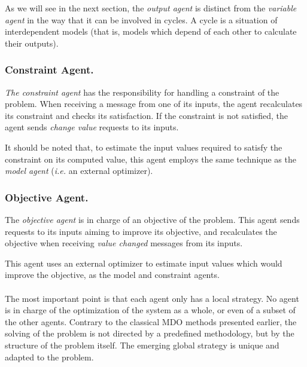 As we will see in the next section, the \emph{output agent} is distinct from the \emph{variable agent} in the way that it can be involved in cycles. A cycle is a situation of interdependent models (that is, models which depend of each other to calculate their outputs).


\subsubsection*{Constraint Agent.}
 \emph{The constraint agent} has the responsibility for handling a constraint of the problem. When receiving a message from one of its inputs, the agent recalculates its constraint and checks its satisfaction. If the constraint is not satisfied, the agent sends \emph{change value} requests to its inputs.


It should be noted that, to estimate the input values required to satisfy the constraint on its computed value, this agent employs the same technique as the \emph{model agent} (\textit{i.e.} an external optimizer).

\subsubsection*{Objective Agent.}
The  \emph{objective agent} is in charge of an objective of the problem. This agent sends requests to its inputs aiming to improve its objective, and recalculates the objective when receiving  \emph{value changed} messages from its inputs.

This agent uses an external optimizer to estimate input values which would improve the objective, as the model and constraint agents.

\paragraph*{}
The most important point is that each agent only has a local strategy. No agent is in charge of the optimization of the system as a whole, or even of a subset of the other agents. Contrary to the classical MDO methods presented earlier, the solving of the problem is not directed by a predefined methodology, but by the structure of the problem itself. The emerging global strategy is unique and adapted to the problem.

